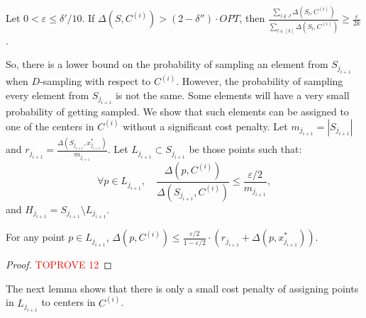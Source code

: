 \documentclass[11pt]{llncs}
\newcommand{\veps}{\varepsilon}
\begin{document}
\begin{corollary}
Let $0 < \veps \leq \delta'/10$. If $\Delta(S, C^{(i)}) > (2-\delta'') \cdot OPT$, then 
$\frac{\sum_{l \notin J} \Delta(S_l, C^{(i)})}{\sum_{l \in [k]} \Delta(S_l, C^{(i)})} \geq \frac{\veps}{2k}$.
\end{corollary}
So, there is a lower bound on the probability of sampling an element from $S_{j_{i+1}}$ when $D$-sampling with respect to $C^{(i)}$. However, the probability of sampling every element from $S_{j_{i+1}}$ is not the same. Some elements will have a very small probability of getting sampled. We show that such elements can be assigned to one of the centers in $C^{(i)}$ without a significant cost penalty. 
Let $m_{j_{i+1}} = |S_{j_{i+1}}|$ and $r_{j_{i+1}} = \frac{\Delta(S_{j_{i+1}}, x^*_{j_{i+1}})}{m_{j_{i+1}}}$.
Let $L_{j_{i+1}} \subset S_{j_{i+1}}$ be those points such that: 
$$
\forall p \in L_{j_{i+1}}, \quad \frac{\Delta(p, C^{(i)})}{\Delta(S_{j_{i+1}}, C^{(i)})} \leq \frac{\veps/2}{m_{j_{i+1}}},
$$
and $H_{j_{i+1}} = S_{j_{i+1}} \setminus L_{j_{i+1}}$. 


\begin{lemma}
For any point $p \in L_{j_{i+1}}$, $\Delta(p, C^{(i)}) \leq \frac{\veps/2}{1 - \veps/2} \cdot (r_{j_{i+1}} + \Delta(p, x^*_{j_{i+1}}))$.
\end{lemma}
\begin{proof}\textcolor{red}{TOPROVE 12}\end{proof}
The next lemma shows that there is only a small cost penalty of assigning points in $L_{j_{i+1}}$ to centers in $C^{(i)}$.
\end{document}
